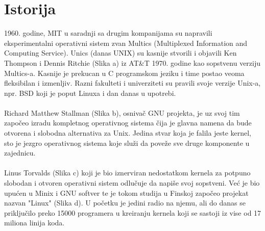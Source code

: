 \documentclass[a4paper,14pt]{article}
\begin{document}
\section{Istorija}
1960. godine, MIT u saradnji sa drugim kompanijama su napravili eksperimentalni operativni sistem zvan Multics (Multiplexed Information and Computing Service). Unics (danas UNIX) su kasnije stvorili i objavili Ken Thompson i Dennis Ritchie  (Slika a) iz AT\&T 1970. godine kao sopstvenu verziju Multics-a. Kasnije je prekucan u C programskom jeziku i time postao veoma fleksibilan i izmenljiv. Razni fakulteti i univerziteti su pravili svoje verzije Unix-a, npr. BSD koji je poput Linuxa i dan danas u upotrebi.
\\\\
Richard Matthew Stallman (Slika b), osnivač GNU projekta, je uz svoj tim započeo izradu kompletnog operativnog sistema čija je glavna namena da bude otvorena i slobodna alternativa za Unix. Jedina stvar koja je falila jeste kernel, sto je jezgro operativnog sistema koje služi da poveže sve druge komponente u zajednicu.
\\\\
Linus Torvalds (Slika c) koji je bio iznerviran nedostatkom kernela za potpuno slobodan i otvoren operativni sistem odlučuje da napiše svoj sopstveni. Već je bio upućen u Minix i GNU softver te je tokom studija u Finskoj započeo projekat nazvan "Linux" (Slika d). U početku je jedini radio na njemu, ali do danas se priključilo preko 15000 programera u kreiranju kernela koji se sastoji iz vise od 17 miliona linija koda.
\\\\
\end{document}
